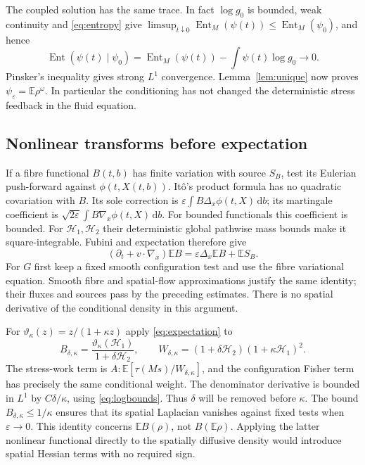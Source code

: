 \documentclass[11pt]{article}
\numberwithin{equation}{section}
\newcommand{\E}{\mathbb E}
\newcommand{\dd}{\,\mathrm d}
\newcommand{\Ent}{\operatorname{Ent}_M}
\newcommand{\grad}{\nabla}
\newcommand{\Hone}{\mathcal H_1}
\newcommand{\Htwo}{\mathcal H_2}
\begin{document}
The coupled solution has the same trace. In fact $\log g_0$ is bounded, weak
continuity and \eqref{eq:entropy} give
$\limsup_{t\downarrow0}\Ent(\psi(t))\leq\Ent(\psi_0)$, and hence
\[
 \operatorname{Ent}(\psi(t)\mid\psi_0)
   =\Ent(\psi(t))-\int\psi(t)\log g_0\longrightarrow0.
\]
Pinsker's inequality gives strong $L^1$ convergence. Lemma~\ref{lem:unique}
now proves $\psi_\varepsilon=\E\rho^\omega$. In particular the conditioning
has not changed the deterministic stress feedback in the fluid equation.

\subsection{Nonlinear transforms before expectation}\label{subsec:Ito}
If a fibre functional $B(t,b)$ has finite variation with source $S_B$, test
its Eulerian push-forward against $\phi(t,X(t,b))$. It\^o's product formula
has no quadratic covariation with $B$. Its sole correction is
$\varepsilon\int B\Delta_x\phi(t,X)\dd b$; its martingale coefficient is
$\sqrt{2\varepsilon}\int B\grad_x\phi(t,X)\dd b$.
For bounded functionals this coefficient is bounded. For $\Hone,\Htwo$
their deterministic global pathwise mass bounds make it square-integrable.
Fubini and expectation therefore give
\begin{equation}\label{eq:expectation}
 (\partial_t+v\cdot\grad_x)\E B
       =\varepsilon\Delta_x\E B+\E S_B.
\end{equation}
For $G$ first keep a fixed smooth configuration test and use the fibre
variational equation. Smooth fibre and spatial-flow approximations justify
the same identity; their fluxes and sources pass by the preceding estimates.
There is no spatial derivative of the conditional density in this argument.

For $\vartheta_\kappa(z)=z/(1+\kappa z)$ apply \eqref{eq:expectation} to
\begin{equation}\label{eq:quotient}
 B_{\delta,\kappa}=\frac{\vartheta_\kappa(\Hone)}{1+\delta\Htwo},\qquad
 W_{\delta,\kappa}=(1+\delta\Htwo)(1+\kappa\Hone)^2.
\end{equation}
The stress-work term is $A:\E[\tau(Ms)/W_{\delta,\kappa}]$, and the
configuration Fisher term has precisely the same conditional weight.
The denominator derivative is bounded in $L^1$ by $C\delta/\kappa$, using
\eqref{eq:logbounds}. Thus $\delta$ will be removed before $\kappa$.
The bound $B_{\delta,\kappa}\leq1/\kappa$ ensures that its spatial Laplacian
vanishes against fixed tests when $\varepsilon\to0$.
This identity concerns $\E B(\rho)$, not $B(\E\rho)$.
Applying the latter nonlinear functional directly to the spatially diffusive
density would introduce spatial Hessian terms with no required sign.
\end{document}
